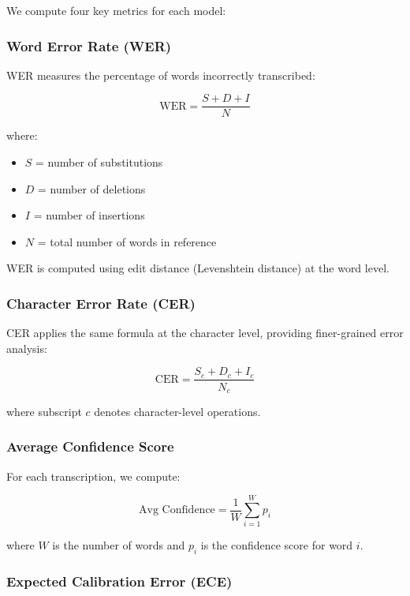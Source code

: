 We compute four key metrics for each model:

\subsubsection{Word Error Rate (WER)}

WER measures the percentage of words incorrectly transcribed:

\begin{equation}
\text{WER} = \frac{S + D + I}{N}
\end{equation}

where:
\begin{itemize}
    \item $S$ = number of substitutions
    \item $D$ = number of deletions
    \item $I$ = number of insertions
    \item $N$ = total number of words in reference
\end{itemize}

WER is computed using edit distance (Levenshtein distance) at the word level.

\subsubsection{Character Error Rate (CER)}

CER applies the same formula at the character level, providing finer-grained error analysis:

\begin{equation}
\text{CER} = \frac{S_c + D_c + I_c}{N_c}
\end{equation}

where subscript $c$ denotes character-level operations.

\subsubsection{Average Confidence Score}

For each transcription, we compute:

\begin{equation}
\text{Avg Confidence} = \frac{1}{W} \sum_{i=1}^{W} p_i
\end{equation}

where $W$ is the number of words and $p_i$ is the confidence score for word $i$.

\subsubsection{Expected Calibration Error (ECE)}

